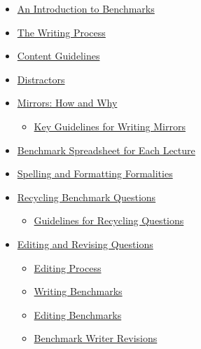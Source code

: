 \documentclass[
]{article}
\providecommand{\tightlist}{%
  \setlength{\itemsep}{0pt}\setlength{\parskip}{0pt}}
\begin{document}
\begin{itemize}
\tightlist
\item
  \protect\hyperlink{an-introduction-to-benchmarks}{An Introduction to Benchmarks}\\
\item
  \protect\hyperlink{the-writing-process}{The Writing Process}
\item
  \protect\hyperlink{content-guidelines}{Content Guidelines}\\
\item
  \protect\hyperlink{distractors}{Distractors}\\
\item
  \protect\hyperlink{mirrors-how-and-why}{Mirrors: How and Why}

  \begin{itemize}
  \tightlist
  \item
    \protect\hyperlink{key-guidelines-for-writing-mirrors}{Key Guidelines for Writing Mirrors}\\
  \end{itemize}
\item
  \protect\hyperlink{benchmark-spreadsheet-for-each-lecture}{Benchmark Spreadsheet for Each Lecture}\\
\item
  \protect\hyperlink{spelling-and-formatting-formalities}{Spelling and Formatting Formalities}\\
\item
  \protect\hyperlink{recycling-benchmark-questions}{Recycling Benchmark Questions}

  \begin{itemize}
  \tightlist
  \item
    \protect\hyperlink{guidelines-for-recycling-questions}{Guidelines for Recycling Questions}\\
  \end{itemize}
\item
  \protect\hyperlink{editing-and-revising-questions}{Editing and Revising Questions}

  \begin{itemize}
  \tightlist
  \item
    \protect\hyperlink{editing-process}{Editing Process}\\
  \item
    \protect\hyperlink{writing-benchmarks}{Writing Benchmarks}\\
  \item
    \protect\hyperlink{editing-benchmarks}{Editing Benchmarks}\\
  \item
    \protect\hyperlink{benchmark-writer-revisions}{Benchmark Writer Revisions}
  \end{itemize}
\end{itemize}
\end{document}
